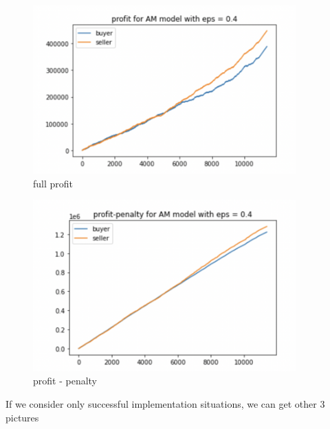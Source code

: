 \documentclass[11pt]{article}
\begin{document}
\begin{figure}[H]
	\begin{center}
	\includegraphics[width=0.9\textwidth]{38.PNG}
	\end{center}
	\caption{full profit}
	\label{FIG.38}
\end{figure}

\begin{figure}[H]
	\begin{center}
	\includegraphics[width=0.9\textwidth]{39.PNG}
	\end{center}
	\caption{profit - penalty}
	\label{FIG.39}
\end{figure}	

If we consider only successful implementation situations, we can get other 3 pictures
\end{document}
